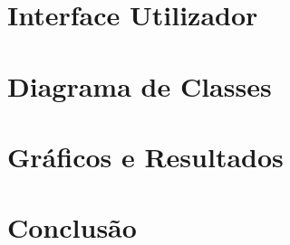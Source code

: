\documentclass[10pt] {article}
\begin{document}
\newpage
\section{Interface Utilizador}

\newpage
\section{Diagrama de Classes}

\newpage
\section{Gráficos e Resultados}

\newpage
\section{Conclusão}
\end{document}
